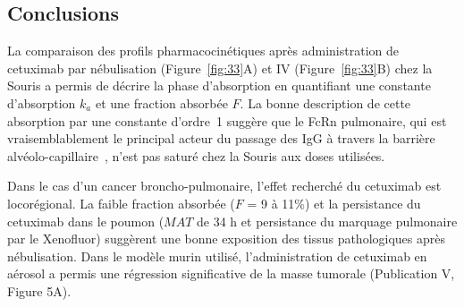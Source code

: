 \subsection{Conclusions}
La comparaison des profils pharmacocinétiques après administration de cetuximab par nébulisation (Figure~\ref{fig:33}A) et IV (Figure~\ref{fig:33}B) chez la Souris a permis de décrire la phase d'absorption en quantifiant une constante d'absorption $k_a$ et une fraction absorbée $F$. La bonne description de cette absorption par une constante d'ordre~1 suggère que le FcRn pulmonaire, qui est vraisemblablement le principal acteur du passage des IgG à travers la barrière alvéolo-capillaire~\citep{REF27}, n'est pas saturé chez la Souris aux doses utilisées.

Dans le cas d'un cancer broncho-pulmonaire, l'effet recherché du cetuximab est locorégional. La faible fraction absorbée ($F$ = 9 à 11\%) et la persistance du cetuximab dans le poumon ($MAT$ de 34 h et persistance du marquage pulmonaire par le Xenofluor) suggèrent une bonne exposition des tissus pathologiques après nébulisation. Dans le modèle murin utilisé, l'administration de cetuximab en aérosol a permis une régression significative de la masse tumorale (Publication V, Figure 5A).
